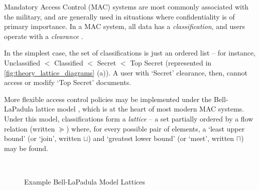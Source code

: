 Mandatory Access Control (MAC) systems are most commonly associated with the military, and are generally used in situations where confidentiality is of primary importance. In a MAC system, all data has a \textit{classification}, and users operate with a \textit{clearance} \cite{sandhu1994access}. 

In the simplest case, the set of classifications is just an ordered list -- for instance, Unclassified $ < $ Classified $ < $ Secret $ < $ Top Secret (represented in \autoref{fig:theory_lattice_diagrams} (a)). A user with `Secret' clearance, then, cannot access or modify `Top Secret' documents.

More flexible access control policies may be implemented under the Bell-LaPadula lattice model \cite{bell1973lattice}, which is at the heart of most modern MAC systems. Under this model, classifications form a \textit{lattice} -- a set partially ordered by a flow relation (written $ \succeq $) where, for every possible pair of elements, a `least upper bound' (or `join', written $ \sqcup $) and `greatest lower bound' (or `meet', written $ \sqcap $) may be found.

\begin{figure}[h!]
	\centering
	\begin{subfigure}[t]{0.2\textwidth}
		\caption{}
	\end{subfigure}
	~
	\begin{subfigure}[t]{0.1\textwidth}
		\caption{}
	\end{subfigure}
	\caption{Example Bell-LaPadula Model Lattices}
	\label{fig:theory_lattice_diagrams}
\end{figure}



